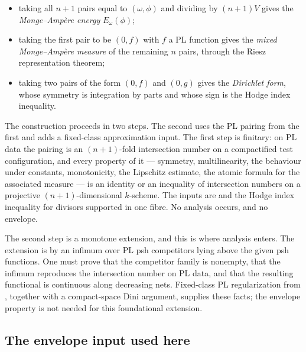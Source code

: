 \begin{itemize}
\item taking all $n+1$ pairs equal to $(\omega,\phi)$ and dividing by
      $(n+1)V$ gives the \emph{Monge--Amp\`ere energy} $E_\omega(\phi)$;
\item taking the first pair to be $(0,f)$ with $f$ a PL function gives
      the \emph{mixed Monge--Amp\`ere measure} of the remaining $n$ pairs,
      through the Riesz representation theorem;
\item taking two pairs of the form $(0,f)$ and $(0,g)$ gives the
      \emph{Dirichlet form}, whose symmetry is integration by parts and
      whose sign is the Hodge index inequality.
\end{itemize}

The construction proceeds in two steps.  The second uses the PL pairing
from the first and adds a fixed-class approximation input.  The first step is finitary: on PL data the pairing is an
$(n+1)$-fold intersection number on a compactified test configuration,
and every property of it --- symmetry, multilinearity, the behaviour under
constants, monotonicity, the Lipschitz estimate, the atomic formula for the
associated measure --- is an identity or an inequality of intersection
numbers on a projective $(n+1)$-dimensional $k$-scheme.  The inputs are
 and the
Hodge index inequality for divisors supported in one fibre.  No analysis
occurs, and no envelope.

The second step is a monotone extension, and this is where analysis enters.
The extension is by an infimum over PL psh competitors lying above the
given psh functions.  One must prove that the competitor family is
nonempty, that the infimum reproduces the intersection number on PL data,
and that the resulting functional is continuous along decreasing nets.
Fixed-class PL regularization from ,
together with a compact-space Dini argument, supplies these facts; the
envelope property is not needed for this foundational extension.

\subsection{The envelope input used here}
\label{sec:ch46-envelope-available}


